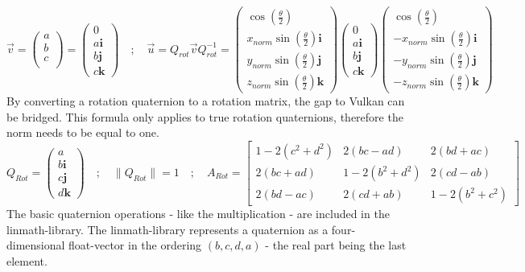 \begin{equation*}
    \vec{v} =
    \begin{pmatrix}
        a \\
        b \\
        c \\
    \end{pmatrix}
    =
    \begin{pmatrix}
        0           \\
        a\textbf{i} \\
        b\textbf{j} \\
        c\textbf{k}
    \end{pmatrix}
    \quad ; \quad
    \vec{u} = Q_{rot}\vec{v}Q_{rot}^{-1}=\begin{pmatrix}
        \cos (\frac{\theta}{2} )                 \\
        x_{norm}\sin(\frac{\theta}{2})\textbf{i} \\
        y_{norm}\sin(\frac{\theta}{2})\textbf{j} \\
        z_{norm}\sin(\frac{\theta}{2})\textbf{k}
    \end{pmatrix}
    \begin{pmatrix}
        0           \\
        a\textbf{i} \\
        b\textbf{j} \\
        c\textbf{k}
    \end{pmatrix}
    \begin{pmatrix}
        \cos (\frac{\theta}{2} )                  \\
        -x_{norm}\sin(\frac{\theta}{2})\textbf{i} \\
        -y_{norm}\sin(\frac{\theta}{2})\textbf{j} \\
        -z_{norm}\sin(\frac{\theta}{2})\textbf{k}
    \end{pmatrix}
\end{equation*}
By converting a rotation quaternion to a rotation matrix, the gap to Vulkan can be bridged. This formula only applies to true rotation quaternions, therefore the norm needs to be equal to one. 
\begin{equation*}
    Q_{Rot}=    \begin{pmatrix}
        a           \\
        b\textbf{i} \\
        c\textbf{j} \\
        d\textbf{k}
    \end{pmatrix}
    \quad ; \quad
    \lVert Q_{Rot} \rVert = 1
    \quad ; \quad
    A_{Rot}
    =
    \begin{bmatrix}
        1-2(c^{2}+d^{2}) & 2(bc-ad) & 2(bd+ac) \\
        2(bc+ad) & 1-2(b^{2}+d^{2}) & 2(cd-ab) \\
        2(bd-ac) & 2(cd+ab) & 1-2(b^{2}+c^{2})
    \end{bmatrix}
\end{equation*}
The basic quaternion operations - like the multiplication - are included in the linmath-library. The linmath-library represents a quaternion as a four-dimensional float-vector in the ordering $(b, c, d, a)$ - the real part being the last element.\\
